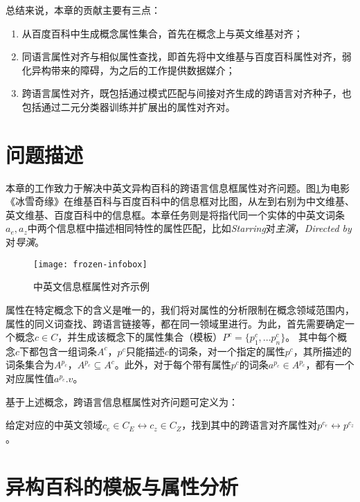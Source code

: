 总结来说，本章的贡献主要有三点：
\begin{enumerate}
\item 从百度百科中生成概念属性集合，首先在概念上与英文维基对齐；
\item 同语言属性对齐与相似属性查找，即首先将中文维基与百度百科属性对齐，弱化异构带来的障碍，为之后的工作提供数据媒介；
\item 跨语言属性对齐，既包括通过模式匹配与间接对齐生成的跨语言对齐种子，也包括通过二元分类器训练并扩展出的属性对齐对。
\end{enumerate}

\section{问题描述}
本章的工作致力于解决中英文异构百科的跨语言信息框属性对齐问题。图\ref{fig:frozen-infobox}为电影《冰雪奇缘》在维基百科与百度百科中的信息框对比图，从左到右别为中文维基、英文维基、百度百科中的信息框。本章任务则是将指代同一个实体的中英文词条$a_e,a_z$中两个信息框中描述相同特性的属性匹配，比如\textit{Starring}对\textit{主演}，\textit{Directed by}对\textit{导演}。

\begin{figure}[h]
  \centering
  \texttt{[image: frozen-infobox]}
  \caption{中英文信息框属性对齐示例}
  \label{fig:frozen-infobox}
\end{figure}

属性在特定概念下的含义是唯一的，我们将对属性的分析限制在概念领域范围内，属性的同义词查找、跨语言链接等，都在同一领域里进行。为此，首先需要确定一个概念$c \in C$，并生成该概念下的属性集合（模板）$P^c=\{p^c_1,...p^c_n\}$。
其中每个概念$c$下都包含一组词条$A^c$，$p^c$只能描述$c$的词条，对一个指定的属性$p^c$，其所描述的词条集合为$A^{p_c}$，$A^{p_c} \subseteq A^c$。此外，对于每个带有属性$p^c$的词条$a^{p_c} \in A^{p_c}$，都有一个对应属性值$a^{p_c}.v$。

基于上述概念，跨语言信息框属性对齐问题可定义为：
\begin{definition}
给定对应的中英文领域$c_e \in C_E \leftrightarrow c_z \in C_Z$，找到其中的跨语言对齐属性对$p^{c_e} \leftrightarrow p^{c_z}$。
\end{definition}

\section{异构百科的模板与属性分析}
\label{sec:template-property-analysis}


